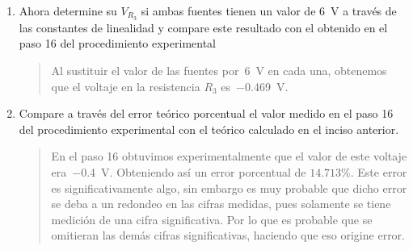 \documentclass{article}
\begin{document}
\begin{enumerate}[label=\alph*.-]
\begin{quote}
            Resolvemos el sistema:
            \[
                \begin{cases}
                    931\, V_1 - 282\, V_{{R_3}_2} &= -132\, V_x\\
                    39\, V_1 - 87\, V_{{R_3}_2} &= 22\, V_x
                \end{cases}
            \]

            Obtenemos que:
            \[
                \boxed{V_{{R_3}_2} = -\frac{25630}{69999}\, V_x}
            \]

            Siendo $-\frac{25630}{69999}$ la segunda constante de linealidad.

            Así obtenemos la expresión para el voltaje $V_{R_3}$ de forma general por superposición:

            \[
                V_{R_3} = \frac{6721}{23333}\, V_y - \frac{25630}{69999}\, V_x
            \]

            Que al evaluar con los valores de las fuentes obtenemos:

            \[
                V_{R_3} = \SI{1.572}{\volt}
            \]

            Al aplicar la fórmula antes usada del error porcentual, tomando en cuenta el voltaje medido en el paso 7 (\SI{1.561}{\volt}), se obtiene un error relativo porcentual de $0.700\%$. Lo cual es extremadamente preciso.

        \end{quote}
        
        \item Ahora determine su $V_{R_3}$ si ambas fuentes tienen un valor de \SI{6}{\volt} a través de las constantes de linealidad y compare este resultado con el obtenido en el paso 16 del procedimiento experimental
        
        \begin{quote}
            Al sustituir el valor de las fuentes por~\SI{6}{\volt} en cada una, obtenemos que el voltaje en la resistencia $R_3$ es~\SI{-0.469}{\volt}.
        \end{quote}
        
        \item Compare a través del error teórico porcentual el valor medido en el paso 16 del procedimiento experimental con el teórico calculado en el inciso anterior.
        \begin{quote}
            En el paso 16 obtuvimos experimentalmente que el valor de este voltaje era~\SI{-0.4}{\volt}. Obteniendo así un error porcentual de $14.713\%$. Este error es significativamente algo, sin embargo es muy probable que dicho error se deba a un redondeo en las cifras medidas, pues solamente se tiene medición de una cifra significativa. Por lo que es probable que se omitieran las demás cifras significativas, haciendo que eso origine error.
        \end{quote}
    \end{enumerate}
\end{document}

